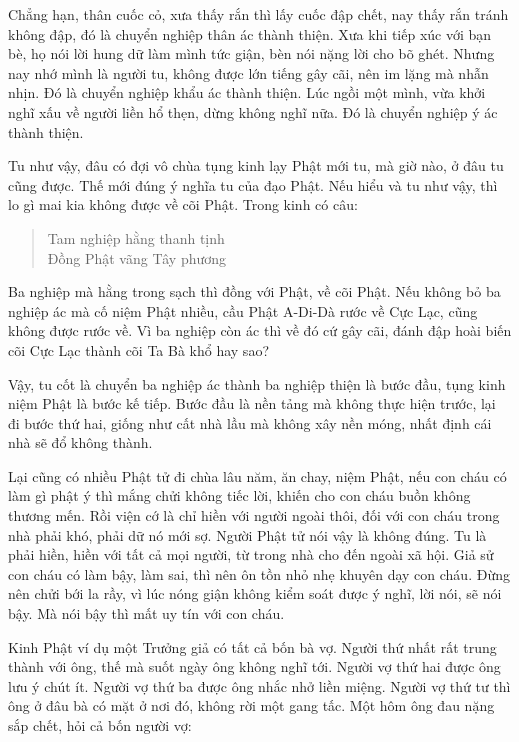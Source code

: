 \documentclass[
  12pt,
  oneside]{book}
\begin{document}
Chẳng hạn, thân cuốc cỏ, xưa thấy rắn thì lấy cuốc đập chết, nay thấy rắn tránh không đập, đó là chuyển nghiệp thân ác thành thiện. Xưa khi tiếp xúc với bạn bè, họ nói lời hung dữ làm mình tức giận, bèn nói nặng lời cho bõ ghét. Nhưng nay nhớ mình là người tu, không được lớn tiếng gây cãi, nên im lặng mà nhẫn nhịn. Đó là chuyển nghiệp khẩu ác thành thiện. Lúc ngồi một mình, vừa khởi nghĩ xấu về người liền hổ thẹn, dừng không nghĩ nữa. Đó là chuyển nghiệp ý ác thành thiện.

Tu như vậy, đâu có đợi vô chùa tụng kinh lạy Phật mới tu, mà giờ nào, ở đâu tu cũng được. Thế mới đúng ý nghĩa tu của đạo Phật. Nếu hiểu và tu như vậy, thì lo gì mai kia không được về cõi Phật. Trong kinh có câu:

\begin{quote}
Tam nghiệp hằng thanh tịnh\\
Đồng Phật vãng Tây phương
\end{quote}

Ba nghiệp mà hằng trong sạch thì đồng với Phật, về cõi Phật. Nếu không bỏ ba nghiệp ác mà cố niệm Phật nhiều, cầu Phật A-Di-Dà rước về Cực Lạc, cũng không được rước về. Vì ba nghiệp còn ác thì về đó cứ gây cãi, đánh đập hoài biến cõi Cực Lạc thành cõi Ta Bà khổ hay sao?

Vậy, tu cốt là chuyển ba nghiệp ác thành ba nghiệp thiện là bước đầu, tụng kinh niệm Phật là bước kế tiếp. Bước đầu là nền tảng mà không thực hiện trước, lại đi bước thứ hai, giống như cất nhà lầu mà không xây nền móng, nhất định cái nhà sẽ đổ không thành.

Lại cũng có nhiều Phật tử đi chùa lâu năm, ăn chay, niệm Phật, nếu con cháu có làm gì phật ý thì mắng chửi không tiếc lời, khiến cho con cháu buồn không thương mến. Rồi viện cớ là chỉ hiền với người ngoài thôi, đối với con cháu trong nhà phải khó, phải dữ nó mới sợ. Người Phật tử nói vậy là không đúng. Tu là phải hiền, hiền với tất cả mọi người, từ trong nhà cho đến ngoài xã hội. Giả sử con cháu có làm bậy, làm sai, thì nên ôn tồn nhỏ nhẹ khuyên dạy con cháu. Đừng nên chửi bới la rầy, vì lúc nóng giận không kiểm soát được ý nghĩ, lời nói, sẽ nói bậy. Mà nói bậy thì mất uy tín với con cháu.

Kinh Phật ví dụ một Trưởng giả có tất cả bốn bà vợ. Người thứ nhất rất trung thành với ông, thế mà suốt ngày ông không nghĩ tới. Người vợ thứ hai được ông lưu ý chút ít. Người vợ thứ ba được ông nhắc nhở liền miệng. Người vợ thứ tư thì ông ở đâu bà có mặt ở nơi đó, không rời một gang tấc. Một hôm ông đau nặng sắp chết, hỏi cả bốn người vợ:
\end{document}
